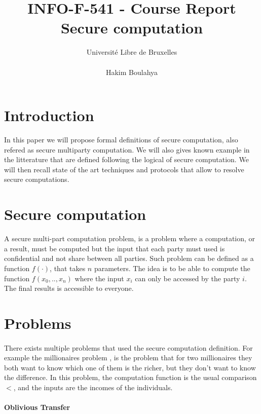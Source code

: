 \documentclass[10pt,a4paper]{article}
\title{INFO-F-541 -     Course Report \\
Secure computation}
\author{Université Libre de Bruxelles \\
\\ Hakim Boulahya}
\begin{document}
\maketitle


\section{Introduction}

In this paper we will propose formal definitions of secure
computation, also refered as secure multiparty computation.
We will also gives known example in the litterature
that are defined following the logical of secure computation.
We will then recall
state of the art techniques and protocols that allow
to resolve secure computations.

\section{Secure computation}

A secure multi-part computation problem, is a problem where a computation,
or a result, must be computed but the input that each party must used
is confidential and not share between all parties. Such problem
can be defined as a function $f(\cdot)$, that takes $n$ parameters.
The idea is to be able to compute the function $f(x_0, .., x_n)$
where the input $x_i$ can only be accessed by the party $i$.
The final results is accessible to everyone.

\section{Problems}

\paragraph{}


There exists multiple problems that used the secure computation definition.
For example the millionaires problem
\cite{yao_protocols_1982}, is the problem that for two millionaires
they both want to know which one of them is the richer, but they
don't want to know the difference. In this problem, the computation
function is the usual comparison $<$, and the inputs are the incomes of
the individuals.


\paragraph{Oblivious Transfer}
\end{document}
